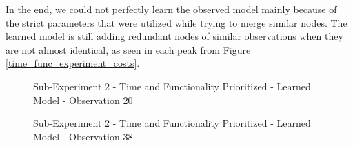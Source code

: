 %
In the end, we could not perfectly learn the observed model mainly because of the strict parameters that were utilized while trying to merge similar nodes. The learned model is still adding redundant nodes of similar observations when they are not almost identical, as seen in each peak from Figure \ref{time_func_experiment_costs}. 
%
%
\begin{figure}[h]
	\centering
	\caption{Sub-Experiment 2 - Time and Functionality Prioritized - Learned Model - Observation 20}
	\label{time_func_experiment_sim_1}
\end{figure}
%
\begin{figure}[h]
	\centering
	\caption{Sub-Experiment 2 - Time and Functionality Prioritized - Learned Model - Observation 38}
	\label{time_func_experiment_sim_2}
\end{figure}
%
\newpage


